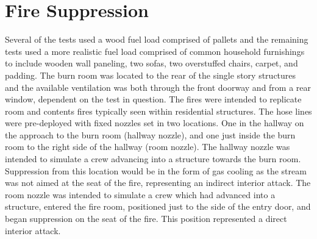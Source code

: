 \documentclass[12pt,oneside]{book}
\begin{document}
\section{Fire Suppression}
\label{sec:Fire_Suppression}
Several of the tests used a wood fuel load comprised of pallets and the remaining tests used a more realistic fuel load comprised of common household furnishings to include wooden wall paneling, two sofas, two overstuffed chairs, carpet, and padding.  The burn room was located to the rear of the single story structures and the available ventilation was both through the front doorway and from a rear window, dependent on the test in question.  The fires were intended to replicate room and contents fires typically seen within residential structures.  The hose lines were pre-deployed with fixed nozzles set in two locations.  One in the hallway on the approach to the burn room (hallway nozzle), and one just inside the burn room to the right side of the hallway (room nozzle). The hallway nozzle was intended to simulate a crew advancing into a structure towards the burn room. Suppression from this location would be in the form of gas cooling as the stream was not aimed at the seat of the fire, representing an indirect interior attack. The room nozzle was intended to simulate a crew which had advanced into a structure, entered the fire room, positioned just to the side of the entry door, and began suppression on the seat of the fire.  This position represented a direct interior attack.
\end{document}
